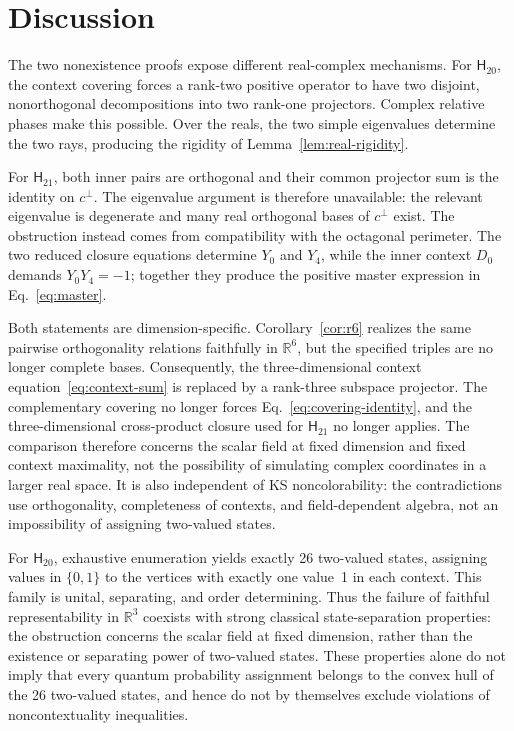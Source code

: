 \documentclass[12pt,a4paper]{article}
\theoremstyle{definition}
\theoremstyle{remark}
\newcommand{\R}{\mathbb R}
\newcommand{\Htwenty}{\mathsf H_{20}}
\newcommand{\Htwentyone}{\mathsf H_{21}}
\begin{document}
\section{Discussion}

The two nonexistence proofs expose different real-complex mechanisms.
For $\Htwenty$, the context covering forces a rank-two positive operator
to have two disjoint, nonorthogonal decompositions into two rank-one
projectors.  Complex relative phases make this possible.  Over the
reals, the two simple eigenvalues determine the two rays, producing the
rigidity of Lemma~\ref{lem:real-rigidity}.

For $\Htwentyone$, both inner pairs are orthogonal and their common
projector sum is the identity on $c^\perp$.  The eigenvalue argument is
therefore unavailable: the relevant eigenvalue is degenerate and many
real orthogonal bases of $c^\perp$ exist.  The obstruction instead comes
from compatibility with the octagonal perimeter.  The two reduced
closure equations determine $Y_0$ and $Y_4$, while the inner context
$D_0$ demands $Y_0Y_4=-1$; together they produce the positive master
expression in Eq.~\eqref{eq:master}.

Both statements are dimension-specific.  Corollary~\ref{cor:r6} realizes the
same pairwise orthogonality relations faithfully in $\R^6$, but the specified
triples are no longer complete bases.  Consequently, the three-dimensional
context equation~\eqref{eq:context-sum} is replaced by a rank-three subspace
projector.  The complementary covering no longer forces
Eq.~\eqref{eq:covering-identity}, and the three-dimensional cross-product
closure used for $\Htwentyone$ no longer applies.  The comparison therefore
concerns the scalar field at fixed dimension and fixed context maximality,
not the possibility of simulating complex coordinates in a larger real
space.  It is also independent of KS noncolorability: the contradictions use
orthogonality, completeness of contexts, and field-dependent algebra, not an
impossibility of assigning two-valued states.

For $\Htwenty$, exhaustive enumeration yields exactly 26 two-valued
states, assigning values in $\{0,1\}$ to the vertices with exactly one
value~1 in each context.  This family is unital, separating, and
order determining.  Thus the failure of faithful representability in
$\R^3$ coexists with strong classical state-separation properties:
the obstruction concerns the scalar field at fixed dimension, rather
than the existence or separating power of two-valued states.  These
properties alone do not imply that every quantum probability assignment
belongs to the convex hull of the 26 two-valued states, and hence do not
by themselves exclude violations of noncontextuality inequalities.
\end{document}
